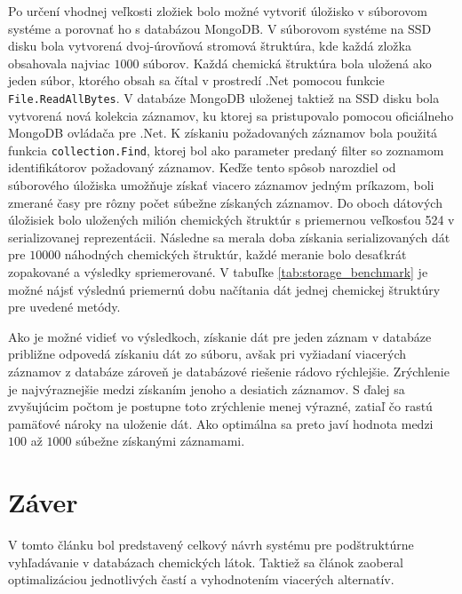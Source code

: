 \documentclass[slovak]{ExcelAtFIT} %
\begin{document}
Po určení vhodnej veľkosti zložiek bolo možné vytvoriť úložisko v súborovom systéme a porovnať ho s databázou MongoDB. V súborovom systéme na SSD disku bola vytvorená dvoj-úrovňová stromová štruktúra, kde každá zložka obsahovala najviac $1000$ súborov. Každá chemická štruktúra bola uložená ako jeden súbor, ktorého obsah sa čítal v prostredí .Net pomocou funkcie \texttt{File.ReadAllBytes}. V databáze MongoDB uloženej taktiež na SSD disku bola vytvorená nová kolekcia záznamov, ku ktorej sa pristupovalo pomocou oficiálneho MongoDB ovládača pre .Net. K získaniu požadovaných záznamov bola použitá funkcia \texttt{collection.Find}, ktorej bol ako parameter predaný filter so zoznamom identifikátorov požadovaný záznamov. Keďže tento spôsob narozdiel od súborového úložiska umožňuje získať viacero záznamov jedným príkazom, boli zmerané časy pre rôzny počet súbežne získaných záznamov. Do oboch dátových úložisiek bolo uložených milión chemických štruktúr s priemernou veľkosťou \SI{524}{\byte} v serializovanej reprezentácii. Následne sa merala doba získania serializovaných dát pre $10000$ náhodných chemických štruktúr, každé meranie bolo desaťkrát zopakované a výsledky spriemerované. V tabuľke \ref{tab:storage_benchmark} je možné nájsť výslednú priemernú dobu načítania dát jednej chemickej štruktúry pre uvedené metódy.

Ako je možné vidieť vo výsledkoch, získanie dát pre jeden záznam v databáze približne odpovedá zí\-ska\-niu dát zo súboru, avšak pri vyžiadaní viacerých záznamov z databáze zároveň je databázové riešenie rádovo rý\-chlej\-šie. Zrýchlenie je najvýraznejšie medzi získaním jenoho a desiatich záznamov. S ďalej sa zvyšujúcim počtom je postupne toto zrýchlenie menej výrazné, zatiaľ čo rastú pamäťové nároky na uloženie dát. Ako optimálna sa preto javí hodnota medzi $100$ až $1000$ súbežne získanými záznamami.

\section{Záver}
\label{sec:Conclusions}

V tomto článku bol predstavený celkový návrh systému pre podštruktúrne vyhľadávanie v databázach che\-mic\-kých látok. Taktiež sa článok zaoberal optimalizáciou jednotlivých častí a vyhodnotením viacerých alternatív.
\end{document}
